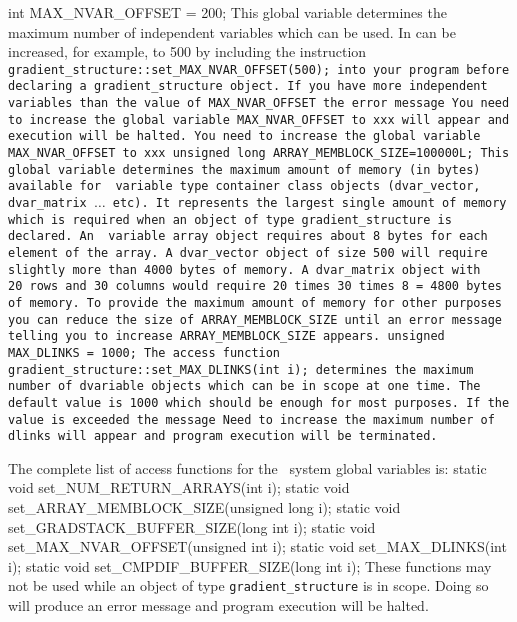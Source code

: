 \documentclass[12pt]{book}
\begin{document}
\beginexample
int MAX_NVAR_OFFSET = 200;  
\endexample
{}  
\noindent This global variable determines the maximum number of independent
variables which can be used. 
In can be increased, for example, to 500 by including the instruction
\beginexample
\tt gradient\_structure::set\_MAX\_NVAR\_OFFSET(500);  
\endexample
\noindent into your program before declaring a {\tt gradient\_structure} object.
If you have more independent variables than the value of
{\tt MAX\_NVAR\_OFFSET} the error message 
\beginexample
You need to increase the global variable MAX_NVAR_OFFSET to xxx
\endexample
\noindent will appear and execution will be halted.
 {You need to increase the global variable 
 MAX\_NVAR\_OFFSET to xxx}
\beginexample
unsigned long ARRAY_MEMBLOCK_SIZE=100000L;  
\endexample
{}  
\noindent
This  global variable determines the maximum amount of memory (in bytes)
available for \AD\ variable type container class objects ({\tt dvar\_vector,
dvar\_matrix $\ldots$ etc}). It represents the largest
single amount of memory which is required when an object of
type {\tt gradient\_structure} is declared. An \AD\ variable array object
requires about 8 bytes for each element of the array. A
{\tt dvar\_vector} object of size 500 will require slightly more than
4000 bytes of memory. A {\tt dvar\_matrix} object with 20~rows and 
30~columns would require 20 times 30 times 8 = 4800 bytes of memory.
To provide the maximum amount of memory for other purposes you can
reduce the size of 
{\tt ARRAY\_MEMBLOCK\_SIZE} until an error message
telling you to increase   {\tt ARRAY\_MEMBLOCK\_SIZE} appears. 
\beginexample
unsigned MAX_DLINKS  = 1000; 
\endexample
\noindent The access function
\beginexample
gradient_structure::set_MAX_DLINKS(int i);
\endexample
\noindent determines the maximum number of {\tt dvariable} objects
which can be in scope at one time. The default value is 1000
which should be enough for most purposes. If the value is
exceeded the message 
\beginexample
Need to increase the maximum number of dlinks
\endexample
\noindent will appear and program execution will be terminated.

The complete list of access functions for the \AD\ system global variables is:
\beginexample
static void set_NUM_RETURN_ARRAYS(int i);
static void set_ARRAY_MEMBLOCK_SIZE(unsigned long i);
static void set_GRADSTACK_BUFFER_SIZE(long int i);
static void set_MAX_NVAR_OFFSET(unsigned int i);
static void set_MAX_DLINKS(int i);
static void set_CMPDIF_BUFFER_SIZE(long int i);
\endexample
\noindent These functions may not be used while an object of
type {\tt gradient\_structure} is in scope. Doing so
will produce an error message and program execution will be halted.
\end{document}
